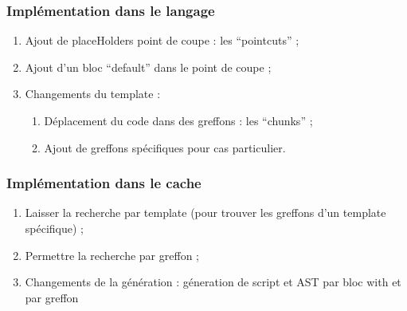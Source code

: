 \documentclass[]{beamer}
\begin{document}
\begin{frame}
\frametitle{Implémentation dans le langage}
\begin{enumerate}[<+->]
    \item Ajout de placeHolders point de coupe : les ``pointcuts'' ;
    \item Ajout d'un bloc ``default'' dans le point de coupe ;
    \item Changements du template :
        \begin{enumerate}
            \item Déplacement du code dans des greffons : les ``chunks'' ;
            \item Ajout de greffons spécifiques pour cas particulier.
        \end{enumerate}
\end{enumerate}
\end{frame}

\begin{frame}
\frametitle{Implémentation dans le cache}
\begin{enumerate}[<+->]
    \item Laisser la recherche par template (pour trouver les greffons d'un
                                             template spécifique) ;
    \item Permettre la recherche par greffon ;
    \item Changements de la génération :
        géneration de script et AST par bloc with et par greffon
\end{enumerate}
\end{frame}
\end{document}
